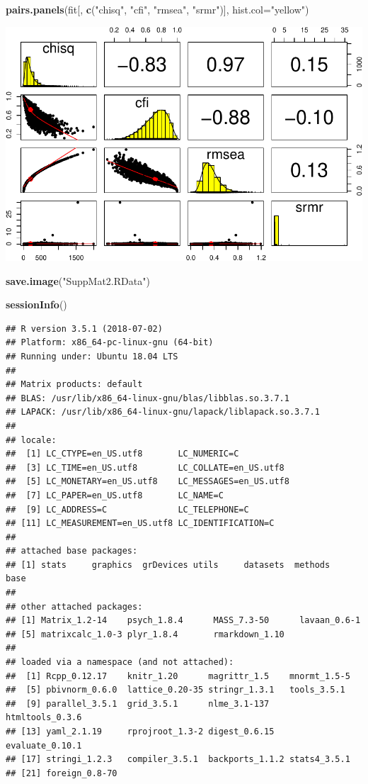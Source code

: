\documentclass[]{article}
\newenvironment{Shaded}{\begin{snugshade}}{\end{snugshade}}
\newcommand{\KeywordTok}[1]{\textcolor[rgb]{0.13,0.29,0.53}{\textbf{#1}}}
\newcommand{\DataTypeTok}[1]{\textcolor[rgb]{0.13,0.29,0.53}{#1}}
\newcommand{\StringTok}[1]{\textcolor[rgb]{0.31,0.60,0.02}{#1}}
\newcommand{\NormalTok}[1]{#1}
\begin{document}
\begin{Shaded}
\begin{Highlighting}[]
\KeywordTok{pairs.panels}\NormalTok{(fit[, }\KeywordTok{c}\NormalTok{(}\StringTok{"chisq"}\NormalTok{, }\StringTok{"cfi"}\NormalTok{, }\StringTok{"rmsea"}\NormalTok{, }\StringTok{"srmr"}\NormalTok{)], }\DataTypeTok{hist.col=}\StringTok{"yellow"}\NormalTok{)}
\end{Highlighting}
\end{Shaded}

\includegraphics{Supplemental_materials_2_files/figure-latex/unnamed-chunk-7-1.pdf}

\begin{Shaded}
\begin{Highlighting}[]
\KeywordTok{save.image}\NormalTok{(}\StringTok{"SuppMat2.RData"}\NormalTok{)}

\KeywordTok{sessionInfo}\NormalTok{()}
\end{Highlighting}
\end{Shaded}

\begin{verbatim}
## R version 3.5.1 (2018-07-02)
## Platform: x86_64-pc-linux-gnu (64-bit)
## Running under: Ubuntu 18.04 LTS
## 
## Matrix products: default
## BLAS: /usr/lib/x86_64-linux-gnu/blas/libblas.so.3.7.1
## LAPACK: /usr/lib/x86_64-linux-gnu/lapack/liblapack.so.3.7.1
## 
## locale:
##  [1] LC_CTYPE=en_US.utf8       LC_NUMERIC=C             
##  [3] LC_TIME=en_US.utf8        LC_COLLATE=en_US.utf8    
##  [5] LC_MONETARY=en_US.utf8    LC_MESSAGES=en_US.utf8   
##  [7] LC_PAPER=en_US.utf8       LC_NAME=C                
##  [9] LC_ADDRESS=C              LC_TELEPHONE=C           
## [11] LC_MEASUREMENT=en_US.utf8 LC_IDENTIFICATION=C      
## 
## attached base packages:
## [1] stats     graphics  grDevices utils     datasets  methods   base     
## 
## other attached packages:
## [1] Matrix_1.2-14    psych_1.8.4      MASS_7.3-50      lavaan_0.6-1    
## [5] matrixcalc_1.0-3 plyr_1.8.4       rmarkdown_1.10  
## 
## loaded via a namespace (and not attached):
##  [1] Rcpp_0.12.17    knitr_1.20      magrittr_1.5    mnormt_1.5-5   
##  [5] pbivnorm_0.6.0  lattice_0.20-35 stringr_1.3.1   tools_3.5.1    
##  [9] parallel_3.5.1  grid_3.5.1      nlme_3.1-137    htmltools_0.3.6
## [13] yaml_2.1.19     rprojroot_1.3-2 digest_0.6.15   evaluate_0.10.1
## [17] stringi_1.2.3   compiler_3.5.1  backports_1.1.2 stats4_3.5.1   
## [21] foreign_0.8-70
\end{verbatim}
\end{document}
